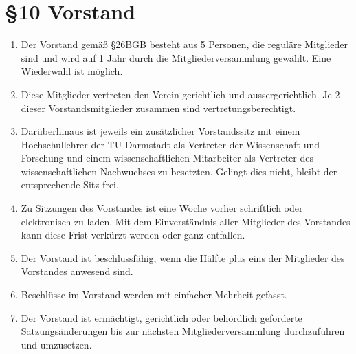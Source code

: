 \section*{§10 Vorstand }
\begin{enumerate}
\item Der Vorstand gemäß §26BGB besteht aus 5 Personen, die reguläre Mitglieder
sind und wird auf 1 Jahr durch die Mitgliederversammlung gewählt.
Eine Wiederwahl ist möglich.
\item Diese Mitglieder vertreten den Verein gerichtlich und aussergerichtlich.
Je 2 dieser Vorstandsmitglieder zusammen sind vertretungsberechtigt.
\item Darüberhinaus ist jeweils ein zusätzlicher Vorstandssitz mit einem
Hochschullehrer der TU Darmstadt als Vertreter der Wissenschaft und
Forschung und einem wissenschaftlichen Mitarbeiter als Vertreter des
wissenschaftlichen Nachwuchses zu besetzten. Gelingt dies nicht, bleibt
der entsprechende Sitz frei.
\item Zu Sitzungen des Vorstandes ist eine Woche vorher schriftlich oder
elektronisch zu laden. Mit dem Einverständnis aller Mitglieder des
Vorstandes kann diese Frist verkürzt werden oder ganz entfallen.
\item Der Vorstand ist beschlussfähig, wenn die Hälfte plus eins der Mitglieder
des Vorstandes anwesend sind.
\item Beschlüsse im Vorstand werden mit einfacher Mehrheit gefasst.
\item Der Vorstand ist ermächtigt, gerichtlich oder behördlich geforderte
Satzungsänderungen bis zur nächsten Mitgliederversammlung durchzuführen
und umzusetzen.
\end{enumerate}
